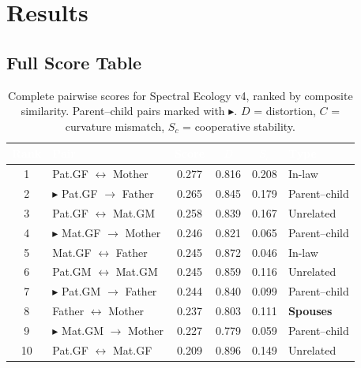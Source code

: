 \documentclass{../yalumba}
\begin{document}
\section{Results}
\label{sec:results}

\subsection{Full Score Table}

\begin{table}[H]
  \centering
  \tablestyle
  \caption{Complete pairwise scores for Spectral Ecology v4, ranked by
    composite similarity.  Parent--child pairs marked with
    $\blacktriangleright$.  $D$ = distortion, $C$ = curvature mismatch,
    $S_c$ = cooperative stability.}
  \label{tab:scores}
  \begin{tabular}{clcccl}
    \toprule
    \rowcolor{table-header}
    \textcolor{white}{\textbf{Rank}} &
    \textcolor{white}{\textbf{Pair}} &
    \textcolor{white}{\textbf{Score}} &
    \textcolor{white}{\textbf{$D$}} &
    \textcolor{white}{\textbf{$S_c$}} &
    \textcolor{white}{\textbf{Type}} \\
    \midrule
    1 & Pat.GF $\leftrightarrow$ Mother
      & 0.277 & 0.816 & 0.208 & In-law \\
    2 & $\blacktriangleright$ Pat.GF $\to$ Father
      & 0.265 & 0.845 & 0.179 & Parent--child \\
    3 & Pat.GF $\leftrightarrow$ Mat.GM
      & 0.258 & 0.839 & 0.167 & Unrelated \\
    4 & $\blacktriangleright$ Mat.GF $\to$ Mother
      & 0.246 & 0.821 & 0.065 & Parent--child \\
    5 & Mat.GF $\leftrightarrow$ Father
      & 0.245 & 0.872 & 0.046 & In-law \\
    6 & Pat.GM $\leftrightarrow$ Mat.GM
      & 0.245 & 0.859 & 0.116 & Unrelated \\
    7 & $\blacktriangleright$ Pat.GM $\to$ Father
      & 0.244 & 0.840 & 0.099 & Parent--child \\
    8 & Father $\leftrightarrow$ Mother
      & 0.237 & 0.803 & 0.111 & \textbf{Spouses} \\
    9 & $\blacktriangleright$ Mat.GM $\to$ Mother
      & 0.227 & 0.779 & 0.059 & Parent--child \\
    10 & Pat.GF $\leftrightarrow$ Mat.GF
      & 0.209 & 0.896 & 0.149 & Unrelated \\
    \bottomrule
  \end{tabular}
\end{table}
\end{document}
